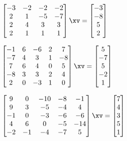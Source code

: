 \begin{exercise}
\begin{Parts}
\item \(\begin{bmatrix} -3&-2&-2&-2
\\2&1&-5&-7
\\2&4&3&3
\\2&1&1&1 \end{bmatrix}\xv
=\begin{bmatrix} -3
\\-8
\\5
\\2 \end{bmatrix}\)
\setbox\ajrqrbox\hbox{}%
\marginajrbox%


\item \(\begin{bmatrix} -1&6&-6&2&7
\\-7&4&3&1&-8
\\7&6&4&0&5
\\-8&3&3&2&4
\\2&0&-3&1&0 \end{bmatrix}\xv
=\begin{bmatrix} 5
\\-7
\\5
\\-2
\\1 \end{bmatrix}\)
\setbox\ajrqrbox\hbox{}%
\marginajrbox%

\begin{reduce}
\item \(\begin{bmatrix} 9&0&-10&-8&-1
\\9&3&-5&-4&4
\\-1&0&-3&-6&-6
\\4&6&0&-5&-14
\\-2&-1&-4&-7&5 \end{bmatrix}\xv
=\begin{bmatrix} 7
\\4
\\3
\\5
\\1 \end{bmatrix}\)
\setbox\ajrqrbox\hbox{}%
\marginajrbox%
\end{reduce}


\end{Parts}
\end{exercise}



